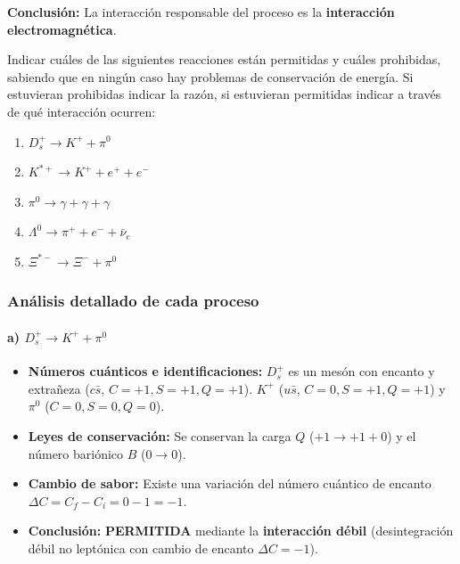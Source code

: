 \begin{problema}
\textbf{Conclusión:} La interacción responsable del proceso es la \textbf{interacción electromagnética}.
\end{problema}

\begin{problema}
Indicar cuáles de las siguientes reacciones están permitidas y cuáles prohibidas, sabiendo que en ningún caso hay problemas de conservación de energía. Si estuvieran prohibidas indicar la razón, si estuvieran permitidas indicar a través de qué interacción ocurren:
\begin{enumerate}[label=\alph*.]
    \item $D_s^+ \rightarrow K^+ + \pi^0$
    \item $K^{*+} \rightarrow K^+ + e^+ + e^-$
    \item $\pi^0 \rightarrow \gamma + \gamma + \gamma$
    \item $\Lambda^0 \rightarrow \pi^+ + e^- + \bar{\nu}_e$
    \item $\Xi^{*-} \rightarrow \Xi^- + \pi^0$
\end{enumerate}

\tcblower

\subsubsection*{Análisis detallado de cada proceso}

\paragraph{a) $D_s^+ \rightarrow K^+ + \pi^0$}
\begin{itemize}
    \item \textbf{Números cuánticos e identificaciones:} 
    $D_s^+$ es un mesón con encanto y extrañeza ($c\bar{s}$, $C = +1, S = +1, Q = +1$). 
    $K^+$ ($u\bar{s}$, $C = 0, S = +1, Q = +1$) y $\pi^0$ ($C = 0, S = 0, Q = 0$).
    \item \textbf{Leyes de conservación:} Se conservan la carga $Q$ ($+1 \to +1 + 0$) y el número bariónico $B$ ($0 \to 0$).
    \item \textbf{Cambio de sabor:} Existe una variación del número cuántico de encanto $\Delta C = C_f - C_i = 0 - 1 = -1$.
    \item \textbf{Conclusión:} \textbf{PERMITIDA} mediante la \textbf{interacción débil} (desintegración débil no leptónica con cambio de encanto $\Delta C = -1$).
\end{itemize}


\end{problema}
